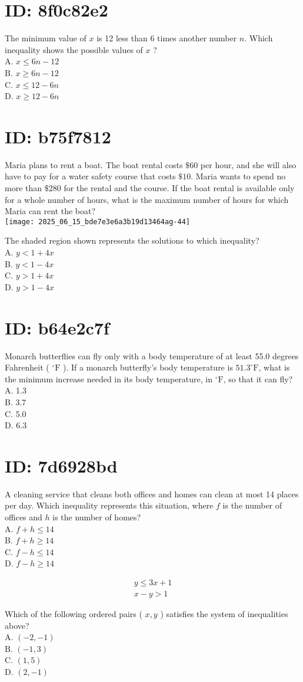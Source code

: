 \section*{ID: 8f0c82e2}
The minimum value of $x$ is 12 less than 6 times another number $n$. Which inequality shows the possible values of $x$ ?\\
A. $x \leq 6 n-12$\\
B. $x \geq 6 n-12$\\
C. $x \leq 12-6 n$\\
D. $x \geq 12-6 n$

\section*{ID: b75f7812}
Maria plans to rent a boat. The boat rental costs $\$ 60$ per hour, and she will also have to pay for a water safety course that costs $\$ 10$. Maria wants to spend no more than $\$ 280$ for the rental and the course. If the boat rental is available only for a whole number of hours, what is the maximum number of hours for which Maria can rent the boat?\\
\texttt{[image: 2025\_06\_15\_bde7e3e6a3b19d13464ag-44]}

The shaded region shown represents the solutions to which inequality?\\
A. $y<1+4 x$\\
B. $y<1-4 x$\\
C. $y>1+4 x$\\
D. $y>1-4 x$

\section*{ID: b64e2c7f}
Monarch butterflies can fly only with a body temperature of at least 55.0 degrees Fahrenheit ( ${ }^{\circ} \mathrm{F}$ ). If a monarch butterfly's body temperature is $51.3^{\circ} \mathrm{F}$, what is the minimum increase needed in its body temperature, in ${ }^{\circ} \mathrm{F}$, so that it can fly?\\
A. 1.3\\
B. 3.7\\
C. 5.0\\
D. 6.3

\section*{ID: 7d6928bd}
A cleaning service that cleans both offices and homes can clean at most 14 places per day. Which inequality represents this situation, where $f$ is the number of offices and $h$ is the number of homes?\\
A. $f+h \leq 14$\\
B. $f+h \geq 14$\\
C. $f-h \leq 14$\\
D. $f-h \geq 14$

$$
\begin{array}{r}
y \leq 3 x+1 \\
x-y>1
\end{array}
$$

Which of the following ordered pairs ( $x, y$ ) satisfies the system of inequalities above?\\
A. $(-2,-1)$\\
B. $(-1,3)$\\
C. $(1,5)$\\
D. $(2,-1)$


